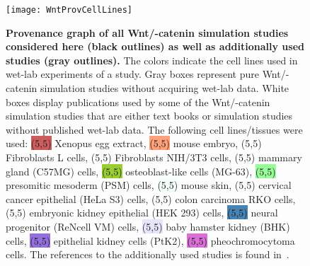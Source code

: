 \documentclass[10pt,letterpaper]{article}
\newcommand{\bcat}{\textbeta-catenin}
\newcommand{\wnt}{Wnt}
\begin{document}
\begin{figure}[!h]
\begin{adjustwidth}{-2.25in}{0in}
\centering
\texttt{[image: WntProvCellLines]}
\caption{{\bf Provenance graph of all \wnt{}/\bcat{} simulation studies considered here (black outlines) as well as additionally used studies (gray outlines).}
The colors indicate the cell lines used in wet-lab experiments of a study.
Gray boxes represent pure \wnt{}/\bcat{} simulation studies without acquiring wet-lab data.
White boxes display publications used by some of the \wnt{}/\bcat{} simulation studies that are either text books or simulation studies without published wet-lab data.
The following cell lines/tissues were used:
\colorbox{IndianRed}{\makebox(5,5){}} Xenopus egg extract, 
\colorbox{LightSalmon}{\makebox(5,5){}} mouse embryo,
\colorbox{color1}{\makebox(5,5){}} Fibroblasts L cells,
\colorbox{color2}{\makebox(5,5){}} Fibroblasts NIH/3T3 cells,
\colorbox{color3}{\makebox(5,5){}} mammary gland (C57MG) cells,
\colorbox{YellowGreen}{\makebox(5,5){}} osteoblast-like cells (MG-63),
\colorbox{PaleGreen}{\makebox(5,5){}} presomitic mesoderm (PSM) cells,
\colorbox{MintCream}{\makebox(5,5){}} mouse skin,
\colorbox{color4}{\makebox(5,5){}} cervical cancer epithelial (HeLa S3) cells,
\colorbox{color5}{\makebox(5,5){}} colon carcinoma RKO cells,
\colorbox{color6}{\makebox(5,5){}} embryonic kidney epithelial (HEK 293) cells,
\colorbox{SteelBlue}{\makebox(5,5){}} neural progenitor (ReNcell VM) cells,
\colorbox{Lavender}{\makebox(5,5){}} baby hamster kidney (BHK) cells,
\colorbox{MediumPurple}{\makebox(5,5){}} epithelial kidney cells (PtK2),
\colorbox{Orchid}{\makebox(5,5){}} pheochromocytoma cells.
The references to the additionally used studies is found in~.
}
\label{fig:WntProvNeato}
\end{adjustwidth}
\end{figure}
\end{document}
